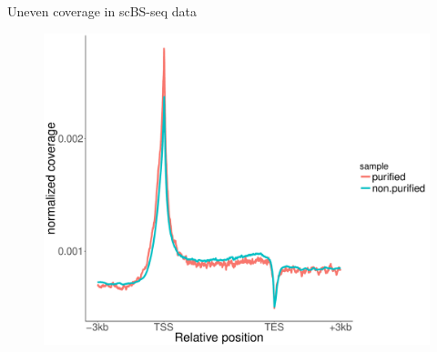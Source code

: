 \documentclass[10pt]{beamer}
\let\Tiny\tiny%
\newcommand{\footlineextra}[1]{
    \begin{tikzpicture}[remember picture,overlay]
        \node[yshift=2ex,anchor=south west] at (current page.south west) {\usebeamerfont{author in head/foot}\hspace{2ex}\Tiny{#1}};
    \end{tikzpicture}
}
\begin{document}
\begin{frame}{Uneven coverage in scBS-seq data}
  \vspace{-0.2cm}
	\begin{figure}
		\includegraphics[scale=0.25, trim={0 0 0 0}, clip]{accessibility_covprofile.pdf}
	\end{figure}
\end{frame}
%
%
\end{document}

